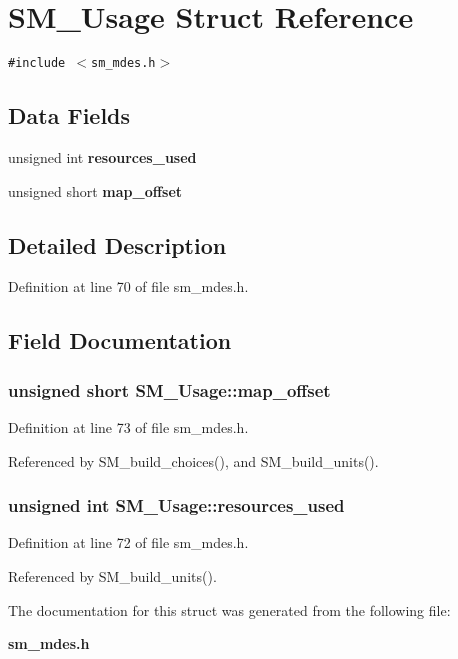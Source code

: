 \section{SM\_\-Usage Struct Reference}
\label{structSM__Usage}
{\tt \#include $<$sm\_\-mdes.h$>$}

\subsection*{Data Fields}
\begin{CompactItemize}
\item 
unsigned int \bf{resources\_\-used}
\item 
unsigned short \bf{map\_\-offset}
\end{CompactItemize}


\subsection{Detailed Description}




Definition at line 70 of file sm\_\-mdes.h.

\subsection{Field Documentation}
\subsubsection{\setlength{\rightskip}{0pt plus 5cm}unsigned short \bf{SM\_\-Usage::map\_\-offset}}\label{structSM__Usage_70c4334cff799f392e9fd0b0a70b846a}




Definition at line 73 of file sm\_\-mdes.h.

Referenced by SM\_\-build\_\-choices(), and SM\_\-build\_\-units().
\subsubsection{\setlength{\rightskip}{0pt plus 5cm}unsigned int \bf{SM\_\-Usage::resources\_\-used}}\label{structSM__Usage_a6c5397bc0a165691c0ca3beb7099c0e}




Definition at line 72 of file sm\_\-mdes.h.

Referenced by SM\_\-build\_\-units().

The documentation for this struct was generated from the following file:\begin{CompactItemize}
\item 
\bf{sm\_\-mdes.h}\end{CompactItemize}
